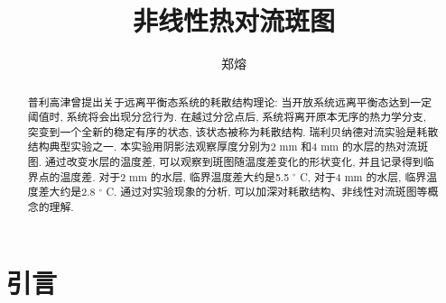 \documentclass[font=default]{mpltx}
\makeatletter
\newcommand{\note}[1]{{\color{gray}#1}}
\newcommand*\file[1]{\textbf{\texttt{#1}}}
\newcommand\releasedate{%
    \href{https://github.com/CastleStar14654/PKUMpLtX/releases/tag/\mpltx@fileversion}%
        {\mpltx@filedate, \mpltx@fileversion}}
\makeatother
\begin{document}
\title{非线性热对流斑图} %
\author{郑熔} %
\date{}
\begin{abstract}
  普利高津曾提出关于远离平衡态系统的耗散结构理论: 当开放系统远离平衡态达到一定阈值时, 系统将会出现分岔行为. 在越过分岔点后, 系统将离开原本无序的热力学分支, 突变到一个全新的稳定有序的状态,
  该状态被称为耗散结构.
  瑞利贝纳德对流实验是耗散结构典型实验之一.
  本实验用阴影法观察厚度分别为2 mm 和4 mm 的水层的热对流斑图. 通过改变水层的温度差, 可以观察到斑图随温度差变化的形状变化, 并且记录得到临界点的温度差. 对于2 mm 的水层, 
  临界温度差大约是5.5 $^\circ$ C, 对于4 mm 的水层, 临界温度差大约是2.8 $^\circ$ C. 通过对实验现象的分析, 可以加深对耗散结构、非线性对流斑图等概念的理解.
 
\end{abstract}

\maketitle

\section{引言}
\end{document}
